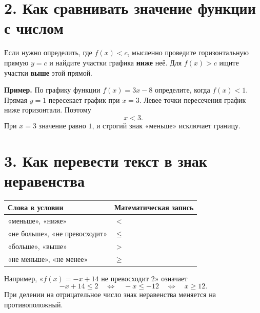 \documentclass[a4paper,12pt]{article}
\newcommand{\lessonsection}[1]{\section*{#1}}
\begin{document}
\lessonsection{2. Как сравнивать значение функции с числом}
Если нужно определить, где $f(x)<c$, мысленно проведите горизонтальную прямую $y=c$ и найдите участки графика \textbf{ниже} неё. Для $f(x)>c$ ищите участки \textbf{выше} этой прямой.

\begin{center}
\end{center}

\textbf{Пример.} По графику функции $f(x)=3x-8$ определите, когда $f(x)<1$. Прямая $y=1$ пересекает график при $x=3$. Левее точки пересечения график ниже горизонтали. Поэтому
\[\boxed{x<3}.\]
При $x=3$ значение равно $1$, и строгий знак «меньше» исключает границу.

\clearpage
\lessonsection{3. Как перевести текст в знак неравенства}
\begin{center}
\renewcommand{\arraystretch}{1.35}
\begin{tabularx}{\linewidth}{X>{\centering\arraybackslash}p{5cm}}
\toprule
\textbf{Слова в условии}&\textbf{Математическая запись}\\
\midrule
«меньше», «ниже» & $<$\\
«не больше», «не превосходит» & $\le$\\
«больше», «выше» & $>$\\
«не меньше», «не менее» & $\ge$\\
\bottomrule
\end{tabularx}
\end{center}
Например, «$f(x)=-x+14$ не превосходит $2$» означает
\vspace{-7pt}
\[-x+14\le2\quad\Longleftrightarrow\quad -x\le-12\quad\Longleftrightarrow\quad x\ge12.\]
При делении на отрицательное число знак неравенства меняется на противоположный.
\end{document}
